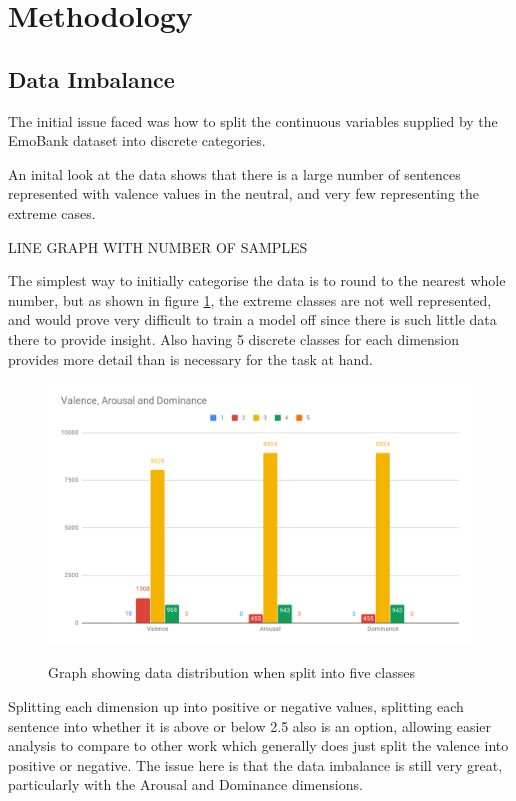    
\section{Methodology}
\subsection{Data Imbalance}

The initial issue faced was how to split the continuous variables supplied by the EmoBank dataset into discrete categories.

An inital look at the data shows that there is a large number of sentences represented with valence values in the neutral, and very few representing the extreme cases. 

LINE GRAPH WITH NUMBER OF SAMPLES

The simplest way to initially categorise the data is to round to the nearest whole number, but as shown in figure \ref{dist:5cat}, the extreme classes are not well represented, and would prove very difficult to train a model off since there is such little data there to provide insight. Also having 5 discrete classes for each dimension provides more detail than is necessary for the task at hand.


\begin{figure}[h]
\caption{Graph showing data distribution when split into five classes}
\centering
\includegraphics[scale=0.3]{graphs/5catDist.png}
\label{dist:5cat}
\end{figure}


Splitting each dimension up into positive or negative values, splitting each sentence into whether it is above or below 2.5 also is an option, allowing easier analysis to compare to other work which generally does just split the valence into positive or negative. The issue here is that the data imbalance is still very great, particularly with the Arousal and Dominance dimensions.

